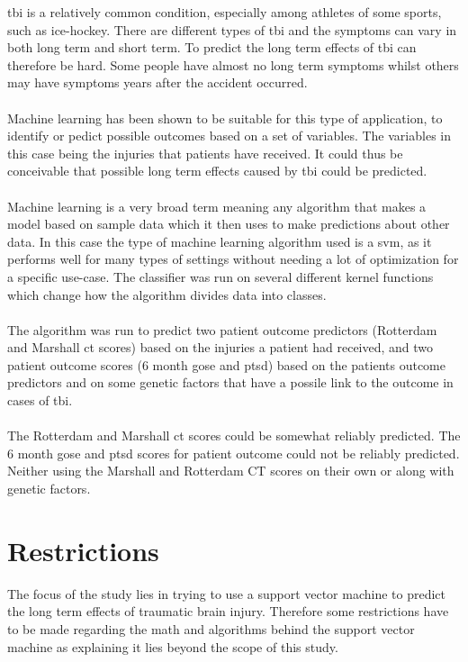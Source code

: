 \documentclass[11pt]{article}
\begin{document}
\Gls{tbi} is a relatively common condition, especially among athletes of some sports, such as ice-hockey\cite{TraumaticBrainInjury}. There are different types of \gls{tbi} and the symptoms can vary in both long term and short term. To predict the long term effects of \gls{tbi} can therefore be hard. Some people have almost no long term symptoms whilst others may have symptoms years after the accident occurred.\cite{TraumaticBrainInjury2021}\\
\\
Machine learning has been shown to be suitable for this type of application, to identify or pedict possible outcomes based on a set of variables\cite{MachineLearning2021}. The variables in this case being the injuries that patients have received. It could thus be conceivable that possible long term effects caused by \gls{tbi} could be predicted.\\
\\
Machine learning is a very broad term meaning any algorithm that makes a model based on sample data which it then uses to make predictions about other data. In this case the type of machine learning algorithm used is a \gls{svm}, as it performs well for many types of settings without needing a lot of optimization for a specific use-case. The classifier was run on several different kernel functions which change how the algorithm divides data into classes\cite{KernelMethod2021}.\cite{jamesSupportVectorMachines}\\
\\
The algorithm was run to predict two patient outcome predictors (Rotterdam and Marshall \gls{ct} scores) based on the injuries a patient had received, and two patient outcome scores (6 month \gls{gose} and \gls{ptsd}) based on the patients outcome predictors and on some genetic factors that have a possile link to the outcome in cases of \gls{tbi}.\\
\\
The Rotterdam and Marshall \gls{ct} scores could be somewhat reliably predicted. The 6 month \gls{gose} and \gls{ptsd} scores for patient outcome could not be reliably predicted. Neither using the Marshall and Rotterdam CT scores on their own or along with genetic factors.



\section*{Restrictions}
The focus of the study lies in trying to use a support vector machine to predict the long term effects of traumatic brain injury. Therefore some restrictions have to be made regarding the math and algorithms behind the support vector machine as explaining it lies beyond the scope of this study.
\end{document}
